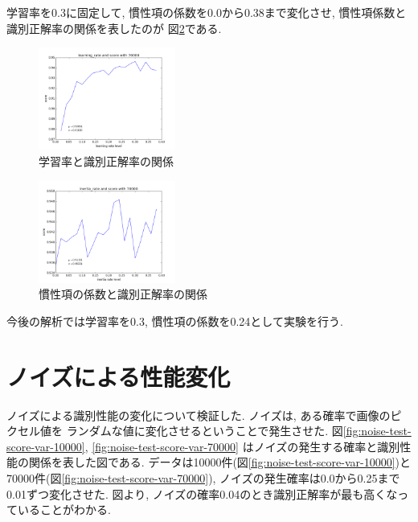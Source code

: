 \documentclass[10pt,a4paper,twocolumn]{jarticle}
\begin{document}
学習率を0.3に固定して, 慣性項の係数を0.0から0.38まで変化させ,
慣性項係数と識別正解率の関係を表したのが
図\ref{fig:inertia-rate-score-var}である. 
\begin{figure}[htbp]
  \centering
  \includegraphics[width=0.4\textwidth]{assets/img/learning_rate_test_mnist_70000.pdf}
  \caption{学習率と識別正解率の関係}
  \label{fig:learning-rate-score-var}
\end{figure}
\begin{figure}[htbp] 
  \centering
  \includegraphics[width=0.4\textwidth]{assets/img/inertia_rate_test_mnist_70000.pdf}
  \caption{慣性項の係数と識別正解率の関係}
  \label{fig:inertia-rate-score-var}
\end{figure}

今後の解析では学習率を0.3, 慣性項の係数を0.24として実験を行う.

\section{ノイズによる性能変化}
ノイズによる識別性能の変化について検証した. 
ノイズは, ある確率で画像のピクセル値を
ランダムな値に変化させるということで発生させた. 
図\ref{fig:noise-test-score-var-10000}, 
\ref{fig:noise-test-score-var-70000}
はノイズの発生する確率と識別性能の関係を表した図である. 
データは10000件(図\ref{fig:noise-test-score-var-10000})と
70000件(図\ref{fig:noise-test-score-var-70000}), 
ノイズの発生確率は0.0から0.25まで0.01ずつ変化させた. 
図より, ノイズの確率0.04のとき識別正解率が最も高くなっていることがわかる. 
\end{document}
